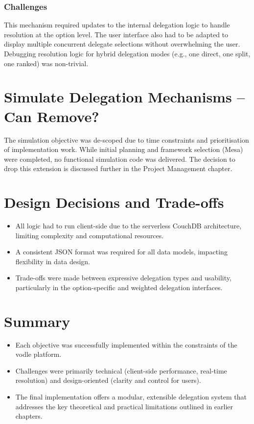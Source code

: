 \subsubsection{Challenges}
This mechanism required updates to the internal delegation logic to handle resolution at the option level. The user interface also had to be adapted to display multiple concurrent delegate selections without overwhelming the user. Debugging resolution logic for hybrid delegation modes (e.g., one direct, one split, one ranked) was non-trivial.

\section{Simulate Delegation Mechanisms -- Can Remove?}
The simulation objective was de-scoped due to time constraints and prioritisation of implementation work. While initial planning and framework selection (Mesa) were completed, no functional simulation code was delivered. The decision to drop this extension is discussed further in the Project Management chapter.

\section{Design Decisions and Trade-offs}
\begin{itemize}
  \item All logic had to run client-side due to the serverless CouchDB architecture, limiting complexity and computational resources.
  \item A consistent JSON format was required for all data models, impacting flexibility in data design.
  \item Trade-offs were made between expressive delegation types and usability, particularly in the option-specific and weighted delegation interfaces.
\end{itemize}

\section{Summary}
\begin{itemize}
  \item Each objective was successfully implemented within the constraints of the vodle platform.
  \item Challenges were primarily technical (client-side performance, real-time resolution) and design-oriented (clarity and control for users).
  \item The final implementation offers a modular, extensible delegation system that addresses the key theoretical and practical limitations outlined in earlier chapters.
\end{itemize}

